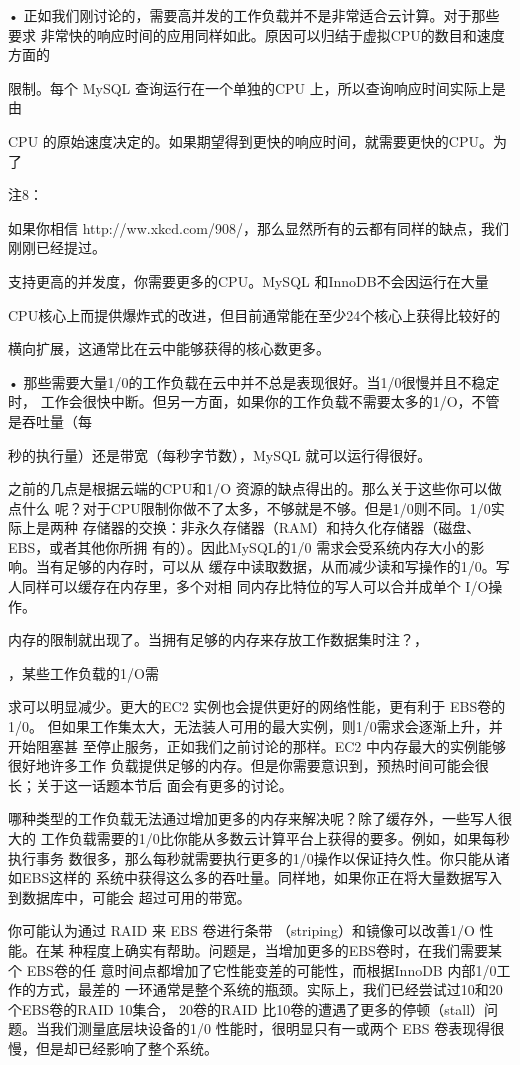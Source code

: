 • 正如我们刚讨论的，需要高并发的工作负载并不是非常适合云计算。对于那些要求
非常快的响应时间的应用同样如此。原因可以归结于虚拟CPU的数目和速度方面的

限制。每个 MySQL 查询运行在一个单独的CPU 上，所以查询响应时间实际上是由

CPU 的原始速度决定的。如果期望得到更快的响应时间，就需要更快的CPU。为了

注8：

如果你相信 http://ww.xkcd.com/908/，那么显然所有的云都有同样的缺点，我们刚刚已经提过。

支持更高的并发度，你需要更多的CPU。MySQL 和InnoDB不会因运行在大量

CPU核心上而提供爆炸式的改进，但目前通常能在至少24个核心上获得比较好的

横向扩展，这通常比在云中能够获得的核心数更多。

• 那些需要大量1/0的工作负载在云中并不总是表现很好。当1/0很慢并且不稳定时，
工作会很快中断。但另一方面，如果你的工作负载不需要太多的1/O，不管是吞吐量（每

秒的执行量）还是带宽（每秒字节数），MySQL 就可以运行得很好。

之前的几点是根据云端的CPU和1/O 资源的缺点得出的。那么关于这些你可以做点什么
呢？对于CPU限制你做不了太多，不够就是不够。但是1/0则不同。1/0实际上是两种
存储器的交换：非永久存储器（RAM）和持久化存储器（磁盘、EBS，或者其他你所拥
有的）。因此MySQL的1/0 需求会受系统内存大小的影响。当有足够的内存时，可以从
缓存中读取数据，从而减少读和写操作的1/0。写人同样可以缓存在内存里，多个对相
同内存比特位的写人可以合并成单个 I/O操作。

内存的限制就出现了。当拥有足够的内存来存放工作数据集时注？，

，某些工作负载的1/O需

求可以明显减少。更大的EC2 实例也会提供更好的网络性能，更有利于 EBS卷的1/0。
但如果工作集太大，无法装人可用的最大实例，则1/0需求会逐渐上升，并开始阻塞甚
至停止服务，正如我们之前讨论的那样。EC2 中内存最大的实例能够很好地许多工作
负载提供足够的内存。但是你需要意识到，预热时间可能会很长；关于这一话题本节后
面会有更多的讨论。

哪种类型的工作负载无法通过增加更多的内存来解决呢？除了缓存外，一些写人很大的
工作负载需要的1/0比你能从多数云计算平台上获得的要多。例如，如果每秒执行事务
数很多，那么每秒就需要执行更多的1/0操作以保证持久性。你只能从诸如EBS这样的
系统中获得这么多的吞吐量。同样地，如果你正在将大量数据写入到数据库中，可能会
超过可用的带宽。

你可能认为通过 RAID 来 EBS 卷进行条带 （striping）和镜像可以改善1/O 性能。在某
种程度上确实有帮助。问题是，当增加更多的EBS卷时，在我们需要某个 EBS卷的任
意时间点都增加了它性能变差的可能性，而根据InnoDB 内部1/0工作的方式，最差的
一环通常是整个系统的瓶颈。实际上，我们已经尝试过10和20个EBS卷的RAID 10集合，
20卷的RAID 比10卷的遭遇了更多的停顿（stall）问题。当我们测量底层块设备的1/0
性能时，很明显只有一或两个 EBS 卷表现得很慢，但是却已经影响了整个系统。

